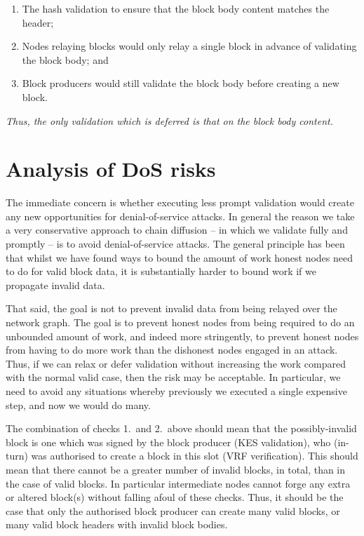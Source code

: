 \documentclass[11pt,a4paper]{article}
\begin{document}
\begin{enumerate} 
  \item The hash validation to ensure that the block body content matches the header;
  \item Nodes relaying blocks would only relay a single block in advance of validating the block body; and
  \item Block producers would still validate the block body before creating a new block.
\end{enumerate}

\emph{Thus, the only validation which is deferred is that on the block body content.}

\section{Analysis of DoS risks}
The immediate concern is whether executing less prompt validation would
create any new opportunities for denial-of-service attacks. In general the reason
we take a very conservative approach to chain diffusion -- in which we validate
fully and promptly -- is to avoid denial-of-service attacks. The general
principle has been that whilst we have found ways to bound the amount of work
honest nodes need to do for valid block data, it is substantially harder to
bound work if we propagate invalid data.

That said, the goal is not to prevent invalid data from being relayed over the
network graph. The goal is to prevent honest nodes from being required to do an
unbounded amount of work, and indeed more stringently, to prevent honest nodes
from having to do more work than the dishonest nodes engaged in an attack. Thus,
if we can relax or defer validation without increasing the work compared with the
normal valid case, then the risk may be acceptable. In particular, we need to avoid any
situations whereby previously we executed a single expensive step, and now we would do many.

The combination of checks 1.~and 2.~above should mean that the possibly-invalid
block is one which was signed by the block producer (KES validation), who (in-turn) was
authorised to create a block in this slot (VRF verification). This should mean that
there cannot be a greater number of invalid blocks, in total, than in the case of valid blocks. In
particular intermediate nodes cannot forge any extra or altered block(s) without
falling afoul of these checks. Thus, it should be the case that only the
authorised block producer can create many valid blocks, or many valid block
headers with invalid block bodies.
\end{document}
